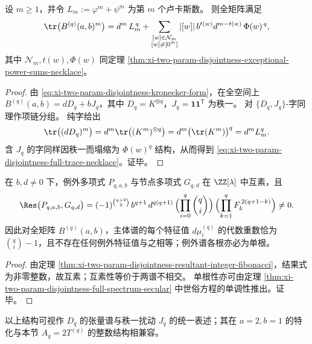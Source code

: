 \begin{theorem}\label{thm:xi-two-param-disjointness-full-trace-necklace}
设 \(m\ge 1\)，并令 \(L_m:=\varphi^m+\psi^m\) 为第 \(m\) 个卢卡斯数。
则全矩阵满足
\begin{equation}\label{eq:xi-two-param-disjointness-full-trace-necklace}
\tr\bigl(B^{(q)}(a,b)^m\bigr)
=d^m\,L_m^{\,q}
+\sum_{\substack{[w]\in\mathcal N_m\\ [w]\ne [0^m]}}
|[w]|\, b^{t(w)}d^{m-t(w)}\,\Phi(w)^{\,q},
\end{equation}
其中 \(\mathcal N_m,t(w),\Phi(w)\) 同定理 \ref{thm:xi-two-param-disjointness-exceptional-power-sums-necklace}。
\end{theorem}
\begin{proof}
由 \eqref{eq:xi-two-param-disjointness-kronecker-form}，在全空间上 \(B^{(q)}(a,b)=dD_q+bJ_q\)，其中 \(D_q=K^{\otimes q}\)，\(J_q=\mathbf 1\mathbf 1^{\mathsf T}\) 为秩一。
对 \(\{D_q,J_q\}\)-字同理作项链分组。
纯字给出
\[
\tr\bigl((dD_q)^m\bigr)=d^m\tr\bigl((K^m)^{\otimes q}\bigr)
=d^m\bigl(\tr(K^m)\bigr)^q
=d^mL_m^q.
\]
含 \(J_q\) 的字同样因秩一而塌缩为 \(\Phi(w)^q\) 结构，从而得到 \eqref{eq:xi-two-param-disjointness-full-trace-necklace}。证毕。
\end{proof}

\begin{corollary}\label{cor:xi-two-param-disjointness-spectrum-disjointness}
在 \(b,d\neq 0\) 下，例外多项式 \(P_{q,a,b}\) 与节点多项式 \(G_{q,d}\) 在 \(\ZZ[\lambda]\) 中互素，且
\[
\Res\bigl(P_{q,a,b},G_{q,d}\bigr)=
(-1)^{\binom{q+2}{2}}\,
b^{q+1}\,d^{q(q+1)}\,
\Bigl(\prod_{i=0}^q\binom{q}{i}\Bigr)\,
\Bigl(\prod_{k=1}^q F_k^{\,2(q+1-k)}\Bigr)\neq 0.
\]
因此对全矩阵 \(B^{(q)}(a,b)\)，主体谱的每个特征值 \(d\mu_i^{(q)}\) 的代数重数恰为 \(\binom{q}{i}-1\)，且不存在任何例外特征值与之相等；例外谱各根亦必为单根。
\end{corollary}
\begin{proof}
由定理 \ref{thm:xi-two-param-disjointness-resultant-integer-fibonacci}，结果式为非零整数，故互素；互素性等价于两谱不相交。
单根性亦可由定理 \ref{thm:xi-two-param-disjointness-full-spectrum-secular} 中世俗方程的单调性推出。证毕。
\end{proof}

\begin{remark}\label{rem:xi-two-param-disjointness-specialization-aq}
以上结构可视作 \(D_q\) 的张量谱与秩一扰动 \(J_q\) 的统一表述；其在 \(a=2,b=1\) 的特化与本节 \(A_q=2T^{(q)}\) 的整数结构相兼容。
\end{remark}

\endinput
